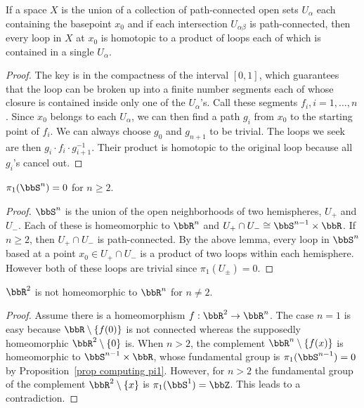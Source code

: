 \begin{lem}\label{lem product of loops}
    If a space $X$ is the union of a collection of path-connected open sets $U_\alpha$ each containing the basepoint $x_0$ and if each intersection $U_{\alpha\beta}$ is path-connected, then every loop in $X$ at $x_0$ is homotopic to a product of loops each of which is contained in a single $U_\alpha$.
\end{lem}
\begin{proof}
    The key is in the compactness of the interval $[0,1]$, which guarantees that the loop can be broken up into a finite number segments each of whose closure is contained inside only one of the $U_\alpha$'s. Call these segments $f_i, i=1,\ldots,n$. Since $x_0$ belongs to each $U_\alpha$, we can then find a path $g_i$ from $x_0$ to the starting point of $f_i$. We can always choose $g_0$ and $g_{n+1}$ to be trivial. The loops we seek are then $g_i\cdot f_i\cdot g_{i+1}^{-1}$. Their product is homotopic to the original loop because all $g_i$'s cancel out.
\end{proof}
\begin{cor}\label{cor pi_1(S^n)=0}
    $\pi_1(\bbS^n)=0$ for $n\geq 2$.
\end{cor}
\begin{proof}
    $\bbS^n$ is the union of the open neighborhoods of two hemispheres, $U_+$ and $U_-$. Each of these is homeomorphic to $\bbR^n$ and $U_+\cap U_-\cong \bbS^{n-1}\times \bbR $. If $n\geq 2$, then $U_+\cap U_-$ is path-connected. By the above lemma, every loop in $\bbS^n$ based at a point $x_0\in U_+\cap U_-$ is a product of two loops within each hemisphere. However both of these loops are trivial since $\pi_1(U_\pm)=0$.
\end{proof}
\begin{cor}
    $\bbR^2$ is not homeomorphic to $\bbR^n$ for $n\neq 2$.
\end{cor}
\begin{proof}
    Assume there is a homeomorphism $f:\bbR^2\to \bbR^n$. The case $n=1$ is easy because $\bbR \setminus\{f(0)\}$ is not connected whereas the supposedly homeomorphic $\bbR^2\setminus\{0\}$ is. 
    When $n>2$, the complement $\bbR^n\setminus\{f(x)\}$ is homeomorphic to $\bbS^{n-1}\times \bbR $, whose fundamental group is $\pi_1(\bbS^{n-1})=0$ by Proposition~\ref{prop computing pi1}. However, for $n>2$ the fundamental group of the complement $\bbR^2\setminus\{x\}$ is $\pi_1(\bbS^1)=\bbZ$. This leads to a contradiction.
\end{proof}

